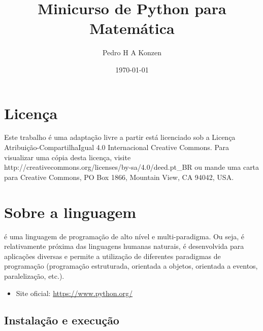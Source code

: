 \documentclass[12pt]{article}
\begin{document}
\ifispython
\lstset { %
  language=Python,
  numbers=right,
  numberstyle=\small,
  stepnumber=1,    
  firstnumber=1,
  xleftmargin=-1em,
  extendedchars=true,
  inputencoding=utf8,
  upquote=true,
  basicstyle=\ttfamily,
  keywordstyle=\ttfamily,
  stringstyle=\ttfamily,
  commentstyle=\ttfamily,
  showspaces=false,
  showstringspaces=false,
  showtabs=false,
}
\fi

\title{Minicurso de Python para Matemática}
\author{Pedro H A Konzen}
\date{\today}

\maketitle

\tableofcontents

\section*{Licença}\label{sec_licenca}

Este trabalho é uma adaptação livre a partir está licenciado sob a Licença Atribuição-CompartilhaIgual 4.0 Internacional Creative Commons. Para visualizar uma cópia desta licença, visite http://creativecommons.org/licenses/by-sa/4.0/deed.pt\_BR ou mande uma carta para Creative Commons, PO Box 1866, Mountain View, CA 94042, USA.


\section{Sobre a linguagem}\label{sec_sobrepy}

{\python} é uma linguagem de programação de alto nível e multi-paradigma. Ou seja, é relativamente próxima das linguagens humanas naturais, é desenvolvida para aplicações diversas e permite a utilização de diferentes paradigmas de programação (programação estruturada, orientada a objetos, orientada a eventos, paralelização, etc.).

\begin{itemize}
\item Site oficial: \href{https://www.python.org/}{https://www.python.org/}
\end{itemize}

\subsection{Instalação e execução}
\end{document}
